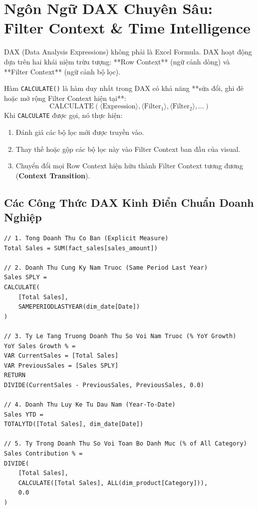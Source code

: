 \section{Ngôn Ngữ DAX Chuyên Sâu: Filter Context \& Time Intelligence}

DAX (Data Analysis Expressions) không phải là Excel Formula. DAX hoạt động dựa trên hai khái niệm trừu tượng: **Row Context** (ngữ cảnh dòng) và **Filter Context** (ngữ cảnh bộ lọc).

\begin{lythuyetbox}
Hàm \texttt{CALCULATE()} là hàm duy nhất trong DAX có khả năng **sửa đổi, ghi đè hoặc mở rộng Filter Context hiện tại**:
\[
\text{CALCULATE}(\langle\text{Expression}\rangle, \langle\text{Filter}_1\rangle, \langle\text{Filter}_2\rangle, \dots)
\]
Khi \texttt{CALCULATE} được gọi, nó thực hiện:
\begin{enumerate}
    \item Đánh giá các bộ lọc mới được truyền vào.
    \item Thay thế hoặc gộp các bộ lọc này vào Filter Context ban đầu của visual.
    \item Chuyển đổi mọi Row Context hiện hữu thành Filter Context tương đương (\textbf{Context Transition}).
\end{enumerate}
\end{lythuyetbox}

\subsection{Các Công Thức DAX Kinh Điển Chuẩn Doanh Nghiệp}

\begin{lstlisting}
// 1. Tong Doanh Thu Co Ban (Explicit Measure)
Total Sales = SUM(fact_sales[sales_amount])

// 2. Doanh Thu Cung Ky Nam Truoc (Same Period Last Year)
Sales SPLY = 
CALCULATE(
    [Total Sales],
    SAMEPERIODLASTYEAR(dim_date[Date])
)

// 3. Ty Le Tang Truong Doanh Thu So Voi Nam Truoc (% YoY Growth)
YoY Sales Growth % = 
VAR CurrentSales = [Total Sales]
VAR PreviousSales = [Sales SPLY]
RETURN
DIVIDE(CurrentSales - PreviousSales, PreviousSales, 0.0)

// 4. Doanh Thu Luy Ke Tu Dau Nam (Year-To-Date)
Sales YTD = 
TOTALYTD([Total Sales], dim_date[Date])

// 5. Ty Trong Doanh Thu So Voi Toan Bo Danh Muc (% of All Category)
Sales Contribution % = 
DIVIDE(
    [Total Sales],
    CALCULATE([Total Sales], ALL(dim_product[Category])),
    0.0
)
\end{lstlisting}

